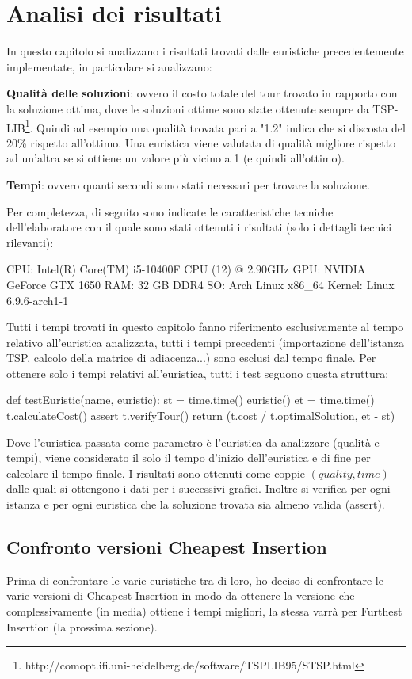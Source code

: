 \documentclass[a4paper,12pt]{report}
\begin{document}
\chapter{Analisi dei risultati}
In questo capitolo si analizzano i risultati trovati dalle euristiche precedentemente implementate, in particolare si analizzano:
\begin{legal}
  \item {\bf Qualità delle soluzioni}: ovvero il costo totale del tour trovato in rapporto con la soluzione ottima, dove le soluzioni ottime sono state ottenute sempre da TSP-LIB\footnote{http://comopt.ifi.uni-heidelberg.de/software/TSPLIB95/STSP.html}. Quindi ad esempio una qualità trovata pari a "1.2" indica che si discosta del 20\% rispetto all'ottimo. Una euristica viene valutata di qualità migliore rispetto ad un'altra se si ottiene un valore più vicino a 1 (e quindi all'ottimo).
  \item {\bf Tempi}: ovvero quanti secondi sono stati necessari per trovare la soluzione.
\end{legal}
Per completezza, di seguito sono indicate le caratteristiche tecniche dell'elaboratore con il quale sono stati ottenuti i risultati (solo i dettagli tecnici rilevanti):
\begin{myverbatim}
CPU: Intel(R) Core(TM) i5-10400F CPU (12) @ 2.90GHz
GPU: NVIDIA GeForce GTX 1650
RAM: 32 GB DDR4
SO: Arch Linux x86_64
Kernel: Linux 6.9.6-arch1-1
\end{myverbatim}
Tutti i tempi trovati in questo capitolo fanno riferimento esclusivamente al tempo relativo all'euristica analizzata, tutti i tempi precedenti (importazione dell'istanza TSP, calcolo della matrice di adiacenza...) sono esclusi dal tempo finale. Per ottenere solo i tempi relativi all'euristica, tutti i test seguono questa struttura:
\begin{python}
def testEuristic(name, euristic):
  st = time.time()
  euristic()
  et = time.time()
  t.calculateCost()
  assert t.verifyTour()
  return (t.cost / t.optimalSolution, et - st)
\end{python}
Dove l'euristica passata come parametro è l'euristica da analizzare (qualità e tempi), viene considerato il solo il tempo d'inizio dell'euristica e di fine per calcolare il tempo finale. I risultati sono ottenuti come coppie $(quality, time)$ dalle quali si ottengono i dati per i successivi grafici. Inoltre si verifica per ogni istanza e per ogni euristica che la soluzione trovata sia almeno valida (assert).

\section{Confronto versioni Cheapest Insertion}
Prima di confrontare le varie euristiche tra di loro, ho deciso di confrontare le varie versioni di Cheapest Insertion in modo da ottenere la versione che complessivamente (in media) ottiene i tempi migliori, la stessa varrà per Furthest Insertion (la prossima sezione). \newline
\end{document}
